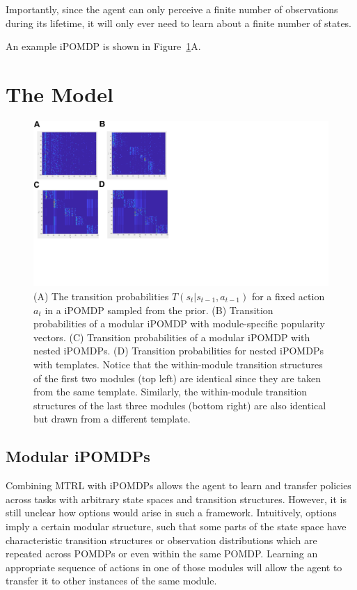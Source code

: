 \documentclass[11pt]{article}
\begin{document}
Importantly, since the agent can only perceive a finite number of observations during its lifetime, it will only ever need to learn about a finite number of states.

An example iPOMDP is shown in Figure~\ref{fig:nested}A.

\section{The Model}


\begin{figure}
\centering
\includegraphics[scale=1,  trim = 0 120 400 10]{figures/nested.pdf}
\caption{(A) The transition probabilities $T(s_t| s_{t-1}, a_{t-1})$ for a fixed action $a_t$ in a iPOMDP sampled from the prior. (B) Transition probabilities of a modular iPOMDP with module-specific popularity vectors. (C) Transition probabilities of a modular iPOMDP with nested iPOMDPs. (D) Transition probabilities for nested iPOMDPs with templates. Notice that the within-module transition structures of the first two modules (top left) are identical since they are taken from the same template. Similarly, the within-module transition structures of the last three modules (bottom right) are also identical but drawn from a different template.}
\label{fig:nested}
\end{figure}

\subsection{Modular iPOMDPs}

Combining MTRL with iPOMDPs allows the agent to learn and transfer policies across tasks with arbitrary state spaces and transition structures. However, it is still unclear how options would arise in such a framework. Intuitively, options imply a certain modular structure, such that some parts of the state space have characteristic transition structures or observation distributions which are repeated across POMDPs or even within the same POMDP. Learning an appropriate sequence of actions in one of those modules will allow the agent to transfer it to other instances of the same module.
\end{document}
